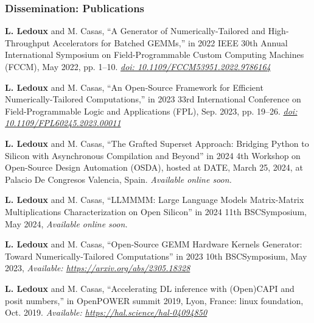 \begin{frame}
\frametitle{Dissemination: Publications}
\scriptsize
\begin{myitemize}
	\item \textbf{L. Ledoux} and M. Casas, “A Generator of Numerically-Tailored and High-Throughput Accelerators for Batched GEMMs,” in 2022 IEEE 30th Annual International Symposium on Field-Programmable Custom Computing Machines (FCCM), May 2022, pp. 1–10. \textit{\url{doi: 10.1109/FCCM53951.2022.9786164}}
	\item \textbf{L. Ledoux} and M. Casas, “An Open-Source Framework for Efficient Numerically-Tailored Computations,” in 2023 33rd International Conference on Field-Programmable Logic and Applications (FPL), Sep. 2023, pp. 19–26. \textit{\url{doi: 10.1109/FPL60245.2023.00011}}
	\item \textbf{L. Ledoux} and M. Casas, “The Grafted Superset Approach: Bridging Python to Silicon with Asynchronous Compilation and Beyond” in 2024 4th Workshop on Open-Source Design Automation (OSDA), hosted at DATE, March 25, 2024, at Palacio De Congresos Valencia, Spain. \textit{Available online soon.}
	\item \textbf{L. Ledoux} and M. Casas, “LLMMMM: Large Language Models Matrix-Matrix Multiplications Characterization on Open Silicon” in 2024 11th BSCSymposium, May 2024, \textit{Available online soon.}
	\item \textbf{L. Ledoux} and M. Casas, “Open-Source GEMM Hardware Kernels Generator: Toward Numerically-Tailored Computations” in 2023 10th BSCSymposium, May 2023, \textit{Available: \url{https://arxiv.org/abs/2305.18328}}
	\item \textbf{L. Ledoux} and M. Casas, “Accelerating DL inference with (Open)CAPI and posit numbers,” in OpenPOWER summit 2019, Lyon, France: linux foundation, Oct. 2019. \textit{Available: \url{https://hal.science/hal-04094850}}

\end{myitemize}
\normalsize
\end{frame}


